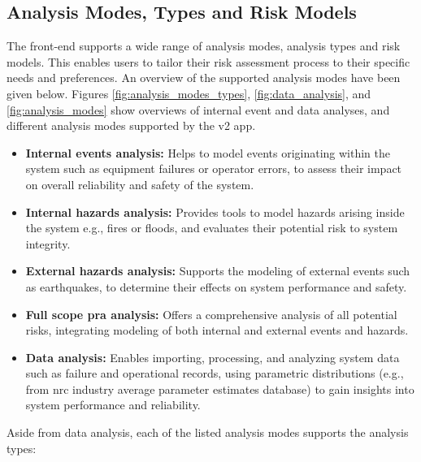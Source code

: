 

\subsection{Analysis Modes, Types and Risk Models}

The front-end supports a wide range of analysis modes, analysis types and risk models. This enables users to tailor their risk assessment process to their specific needs and preferences. An overview of the supported analysis modes have been given below. Figures \ref{fig:analysis_modes_types}, \ref{fig:data_analysis}, and \ref{fig:analysis_modes} show overviews of internal event and data analyses, and different analysis modes supported by the v2 app.

\begin{itemize}
  \item \textbf{Internal events analysis:} Helps to model events originating within the system such as equipment failures or operator errors, to assess their impact on overall reliability and safety of the system.
  \item \textbf{Internal hazards analysis:} Provides tools to model hazards arising inside the system e.g., fires or floods, and evaluates their potential risk to system integrity.
  \item \textbf{External hazards analysis:} Supports the modeling of external events such as earthquakes, to determine their effects on system performance and safety.
  \item \textbf{Full scope \acrshort{pra} analysis:} Offers a comprehensive analysis of all potential risks, integrating modeling of both internal and external events and hazards.
  \item \textbf{Data analysis:} Enables importing, processing, and analyzing system data such as failure and operational records, using parametric distributions (e.g., from \acrshort{nrc} industry average parameter estimates database) to gain insights into system performance and reliability.
\end{itemize}

Aside from data analysis, each of the listed analysis modes supports the analysis types:

